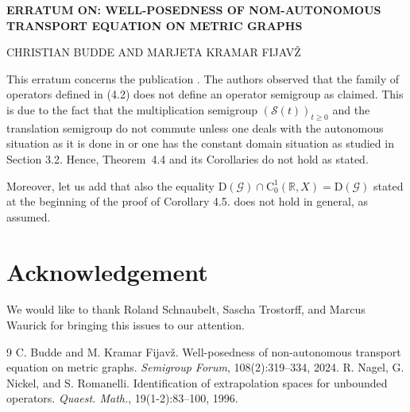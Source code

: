 \documentclass[a4paper,oneside,10pt]{amsart}
\theoremstyle{definition}
\numberwithin{equation}{section}
\def\dom{\mathrm{D}}
\begin{document}
\newpage

\begin{center}
\textbf{ERRATUM ON: WELL-POSEDNESS OF NOM-AUTONOMOUS TRANSPORT EQUATION ON METRIC GRAPHS}
\end{center}


\bigskip
\begin{center}
CHRISTIAN BUDDE AND MARJETA KRAMAR FIJAV\v{Z}
\end{center}

\bigskip
This erratum concerns the publication \cite{BKF24}. The authors observed that the family of operators defined in (4.2) does not define an operator semigroup as claimed. This is due to the fact that the multiplication semigroup $(\mathcal{S}(t))_{t\geq0}$ and the translation semigroup do not commute unless one deals with the autonomous situation as it is done in \cite{NNR1996} or one has the constant domain situation as studied in Section 3.2. Hence, Theorem~4.4 and its Corollaries do not hold as stated. 
\label{erratum}

Moreover, let us add that also  the equality $\dom(\mathscr{G})\cap\mathrm{C}_0^1(\mathbb{R},X)=\dom(\mathscr{G})$ stated at the beginning of the proof of Corollary 4.5. does not hold in general, as assumed. 

\section*{Acknowledgement}
We would like to thank Roland Schnaubelt, Sascha Trostorff, and Marcus Waurick for bringing this issues to our attention. 

\begin{thebibliography}{9}
 C. Budde and M. Kramar Fijav\v{z}. Well-posedness of non-autonomous transport equation on metric graphs. \emph{Semigroup Forum}, 108(2):319--334, 2024.
 R. Nagel, G. Nickel, and S. Romanelli. Identification of extrapolation spaces for unbounded operators. \emph{Quaest. Math.}, 19(1-2):83--100, 1996.
\end{thebibliography}
\end{document}
